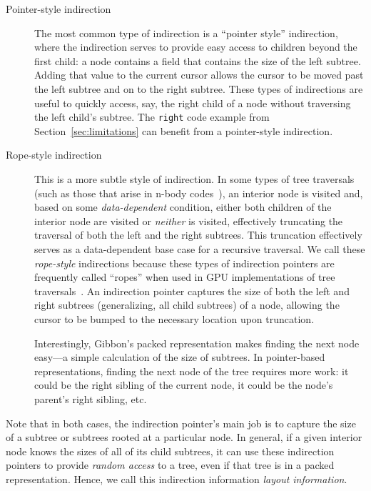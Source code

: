 \documentclass[a4paper,english]{lipics-v2016}
\newcommand{\treelang}{Gibbon\xspace} %
\begin{document}
\begin{description}
  \item[Pointer-style indirection] The most common type of indirection is a
  ``pointer style'' indirection, where the indirection serves to provide easy
  access to children beyond the first child: a node contains a field that
  contains the size of the left subtree. Adding that value to the current
  cursor allows the cursor to be moved past the left subtree and on to the
  right subtree. These types of indirections are useful to quickly access,
  say, the right child of a node without traversing the left child's subtree.
  The {\tt right} code example from Section~\ref{sec:limitations} can benefit
  from a pointer-style indirection.
  \item[Rope-style indirection] This is a more subtle style of indirection. In
  some types of tree traversals (such as those that arise in n-body
  codes~\cite{gray2000n}), an interior node is visited and, based on some {\em
  data-dependent} condition, either both children of the interior node are
  visited or {\em neither} is visited, effectively truncating the traversal of
  both the left and the right subtrees. This truncation effectively serves as
  a data-dependent base case for a recursive traversal. We call these {\em
  rope-style} indirections because these types of indirection pointers are
  frequently called ``ropes'' when used in GPU implementations of tree
  traversals~\cite{goldfarb13sc,popov07,hapala11}. An indirection pointer
  captures the size of both the left and right subtrees (generalizing, all
  child subtrees) of a node, allowing the cursor to be bumped to the necessary
  location upon truncation.
  
  Interestingly, \treelang{}'s packed representation makes finding the next
  node easy---a simple calculation of the size of subtrees. In pointer-based
  representations, finding the next node of the tree requires more work: it
  could be the right sibling of the current node, it could be the node's
  parent's right sibling, etc.
\end{description}

Note that in both cases, the indirection pointer's main job is to capture the
size of a subtree or subtrees rooted at a particular node. In general, if a
given interior node knows the sizes of all of its child subtrees, it can use
these indirection pointers to provide {\em random access} to a tree, even if
that tree is in a packed representation. Hence, we call this indirection
information {\em layout information}.
\end{document}
